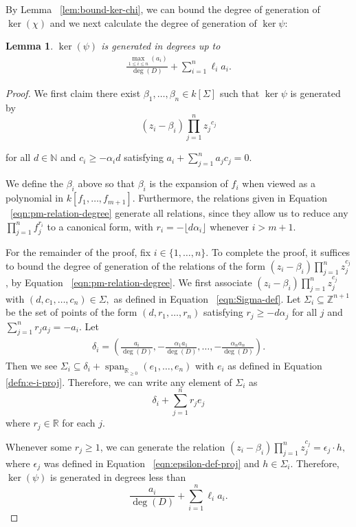 \documentclass{amsart}
\theoremstyle{plain}
\newtheorem{lem}[thm]{Lemma}
\theoremstyle{definition}
\theoremstyle{remark}
\numberwithin{equation}{section}
\newcommand\br{{\mathbb R}}
\newcommand\bida{a}
\DeclareMathOperator{\newspan}{span}
\begin{document}
By Lemma ~\ref{lem:bound-ker-chi}, we can bound the degree of generation of $\ker(\chi)$ and we next calculate the degree of generation of $\ker \psi$:

\begin{lem}
\label{lem:proj-relations-psi}
$\ker(\psi)$ is generated in degrees up to
\begin{align}
\label{eqn:pm-relation-degree}
	\frac{\max_{1\le i \le n}(\bida_i)}{\deg(D)} +  \sum_{i=1}^n \ell_i a_i.
\end{align}

\end{lem}

\begin{proof}
We first claim there exist $\beta_1, \ldots, \beta_n \in k[\Sigma]$ such that $\ker \psi$ is generated by
\begin{equation}
\label{eqn:relations-psi-proj}
	(z_i - \beta_i)\prod_{j=1}^n {z_j}^{c_{j}}
\end{equation}

\noindent
for all $d \in \mathbb{N}$ and $c_i \ge -\alpha_i d$ satisfying $\bida_i + \sum_{j = 1}
^n \bida_j c_j = 0$.

We define the $\beta_i$ above so that $\beta_i$ is the expansion of $f_i$ when viewed as a polynomial in $k[f_1,\ldots, f_{m+1}]$. Furthermore, the relations given in Equation ~\eqref{eqn:pm-relation-degree}
generate all relations, since they allow us to reduce any $\prod_{j =
1}^n f_j^{r_i}$ to a canonical form, with $r_i = -\lfloor d \alpha_i\rfloor$ whenever $i  > m + 1$.

For the remainder of the proof, fix $i \in \{1,\ldots, n\}$. 
To complete the proof, it suffices to bound the degree of generation of the relations of the form $(z_i - \beta_i) \prod_{j=1}^n z_j^{c_j}$, by 
Equation ~\eqref{eqn:pm-relation-degree}.  We first associate $(z_i - \beta_i)\prod_{j=1}^n z_j^{c_j}$ with $(d, c_1, \ldots, c_n) \in \Sigma,$ as defined in Equation ~\eqref{eqn:Sigma-def}.  
Let $\Sigma_i \subseteq \mathbb{Z}^{n+1}$ be the set of points of the form $(d, r_1, \ldots, r_n)$ satisfying $r_j \ge -d \alpha_j$ for all $j$ and $\sum_{j=1}^n r_j a_j = -a_i$.  Let 
\begin{align*}
	\delta_i = \left(\frac{a_i}{\deg(D)}, -\frac{\alpha_1 a_1}{\deg(D)}, \ldots, - \frac{\alpha_n a_n}{\deg(D)} \right).
\end{align*}
Then we see $\Sigma_i \subseteq \delta_i + \newspan_{\br_{\geq 0}}(e_1, \ldots, e_n)$ with $e_i$ as defined in Equation \ref{defn:e-i-proj}.
Therefore, we can write any element of $\Sigma_i$ as
\[
	\delta_i + \sum_{j=1}^n r_j e_j
\]
where $r_j \in \mathbb{R}$ for each $j$.

Whenever some $r_j \ge 1$, we can generate the relation $(z_i - \beta_i)\prod_{j=1}^n z_j^{c_j} = \epsilon_j \cdot h,$ where $\epsilon_j$ was defined in Equation ~\ref{eqn:epsilon-def-proj} and $h \in \Sigma_i$.  Therefore, $\ker(\psi)$ is generated in degrees less than
\[
	\frac{\bida_i}{\deg(D)} + \sum_{i=1}^n \ell_i a_i.
\]
\end{proof}
\end{document}
